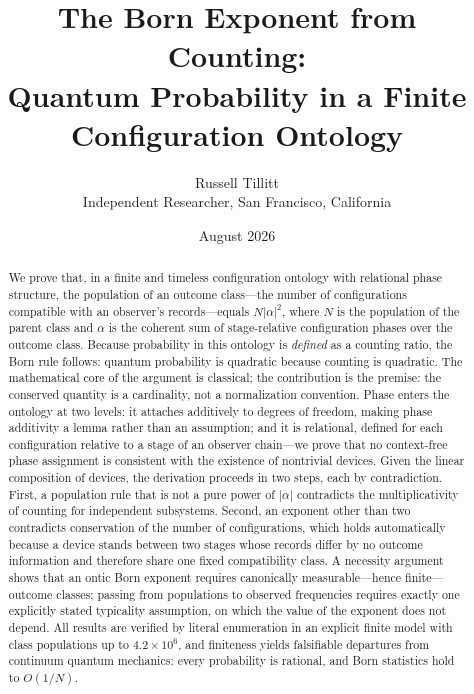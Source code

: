 \documentclass[11pt]{article}
\title{The Born Exponent from Counting:\\ Quantum Probability in a Finite Configuration Ontology}
\author{Russell Tillitt\\ \small Independent Researcher, San Francisco, California}
\date{August 2026}
\theoremstyle{definition}
\theoremstyle{remark}
\begin{document}
\maketitle

\begin{abstract}
We prove that, in a finite and timeless configuration ontology with relational phase structure, the population of an outcome class---the number of configurations compatible with an observer's records---equals $N|\alpha|^2$, where $N$ is the population of the parent class and $\alpha$ is the coherent sum of stage-relative configuration phases over the outcome class. Because probability in this ontology is \emph{defined} as a counting ratio, the Born rule follows: quantum probability is quadratic because counting is quadratic. The mathematical core of the argument is classical; the contribution is the premise: the conserved quantity is a cardinality, not a normalization convention. Phase enters the ontology at two levels: it attaches additively to degrees of freedom, making phase additivity a lemma rather than an assumption; and it is relational, defined for each configuration relative to a stage of an observer chain---we prove that no context-free phase assignment is consistent with the existence of nontrivial devices. Given the linear composition of devices, the derivation proceeds in two steps, each by contradiction. First, a population rule that is not a pure power of $|\alpha|$ contradicts the multiplicativity of counting for independent subsystems. Second, an exponent other than two contradicts conservation of the number of configurations, which holds automatically because a device stands between two stages whose records differ by no outcome information and therefore share one fixed compatibility class. A necessity argument shows that an ontic Born exponent requires canonically measurable---hence finite---outcome classes; passing from populations to observed frequencies requires exactly one explicitly stated typicality assumption, on which the value of the exponent does not depend. All results are verified by literal enumeration in an explicit finite model with class populations up to $4.2 \times 10^6$, and finiteness yields falsifiable departures from continuum quantum mechanics: every probability is rational, and Born statistics hold to $O(1/N)$.
\end{abstract}
\end{document}
